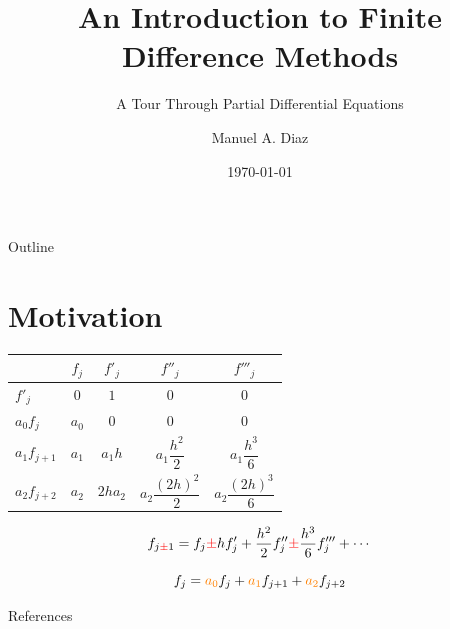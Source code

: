 \documentclass[aspectratio=169,11pt]{beamer}
\title{An Introduction to Finite Difference Methods}
\subtitle{A Tour Through Partial Differential Equations}
\author{Manuel A. Diaz}
\institute{InspiraSTEM Internship}
\date{\today}
\begin{document}
\begin{frame}
  \titlepage
\end{frame}

\begin{frame}{Outline}
  \tableofcontents
\end{frame}

\section{Motivation}

\begin{table}[ht]
\centering
\begin{tabular}{lcccc}
\toprule
 & $f_j$ & $f'_j$ & $f''_j$ & $f'''_j$ \\
\midrule
$f'_j$ & \color{red}$0$ & \color{red}$1$ & \color{red}$0$ & \color{gray}$0$ \\
\midrule
$a_0f_j$ &
\color{blue}$a_0$ &
\color{blue}$0$ &
\color{blue}$0$ &
\color{gray}$0$ \\
\midrule
$a_1f_{j+1}$ &
\color{blue}$a_1$ &
\color{blue}$a_1h$ &
\color{blue}$a_1\dfrac{h^2}{2}$ &
\color{gray}$a_1\dfrac{h^3}{6}$ \\
\midrule
$a_2f_{j+2}$ &
\color{blue}$a_2$ &
\color{blue}$2ha_2$ &
\color{blue}$a_2\dfrac{(2h)^2}{2}$ &
\color{gray}$a_2\dfrac{(2h)^3}{6}$ \\
\bottomrule
\end{tabular}
\end{table}

$$f_{j{\color{red}\pm}1}=f_j{\color{red}\pm} hf_j'+\frac{h^2}{2}f_j''{\color{red}\pm}\frac{h^3}{6}f_j'''+\cdots$$

$$f_j = {\color{orange}a_0} f_{j} + {\color{orange}a_1} f_{j+1} + {\color{orange}a_2} f_{j+2}$$


\begin{frame}[allowframebreaks]{References}
  \printbibliography[heading=none]
\end{frame}
\end{document}
